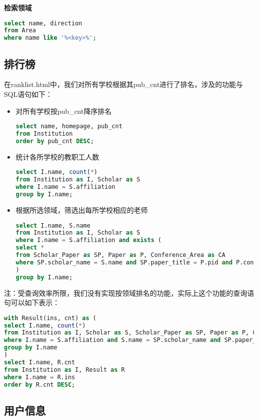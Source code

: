 {\bf 检索领域}
\begin{lstlisting}[language=SQL]
select name, direction
from Area
where name like '%<key>%';
\end{lstlisting}


\subsection{排行榜}

在ranklist.html中，我们对所有学校根据其pub\_cnt进行了排名，涉及的功能与SQL语句如下：
\begin{itemize}
\item 对所有学校按pub\_cnt降序排名
\begin{lstlisting}[language=SQL]
select name, homepage, pub_cnt
from Institution
order by pub_cnt DESC;
\end{lstlisting}
\item 统计各所学校的教职工人数
\begin{lstlisting}[language=SQL]
select I.name, count(*)
from Institution as I, Scholar as S
where I.name = S.affiliation
group by I.name;
\end{lstlisting}
\item 根据所选领域，筛选出每所学校相应的老师
\begin{lstlisting}[language=SQL]
select I.name, S.name
from Institution as I, Scholar as S
where I.name = S.affiliation and exists (
select *
from Scholar_Paper as SP, Paper as P, Conference_Area as CA
where SP.scholar_name = S.name and SP.paper_title = P.pid and P.conf_id = CA.conf_id and CA.area in :area_list
)
group by I.name;
\end{lstlisting}
\end{itemize}
注：受查询效率所限，我们没有实现按领域排名的功能，实际上这个功能的查询语句可以如下表示：
\begin{lstlisting}[language=SQL]
with Result(ins, cnt) as (
select I.name, count(*)
from Institution as I, Scholar as S, Scholar_Paper as SP, Paper as P, Conferece_Area as CA
where I.name = S.affiliation and S.name = SP.scholar_name and SP.paper_title = P.pid and P.conf_id = CA.conf_id and CA.area in :area_list
group by I.name
)
select I.name, R.cnt
from Institution as I, Result as R
where I.name = R.ins
order by R.cnt DESC;
\end{lstlisting}

\subsection{用户信息}

